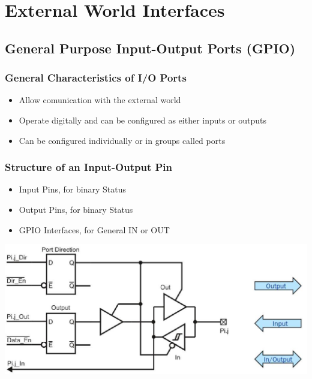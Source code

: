 \section{External World Interfaces}
\subsection{General Purpose Input-Output Ports (GPIO)}
\subsubsection{General Characteristics of I/O Ports}
\begin{itemize}
	\item Allow comunication with the external world
	\item Operate digitally and can be configured as either inputs or outputs
	\item Can be configured individually or in groups called ports
\end{itemize}
\begin{multicols}{2}
	\subsubsection{Structure of an Input-Output Pin}
	\begin{itemize}
		\item Input Pins, for binary Status
		\item Output Pins, for binary Status
		\item GPIO Interfaces, for General IN or OUT
	\end{itemize}
	
	\includegraphics[width=\linewidth]{images/IOStructure}  
\end{multicols}

